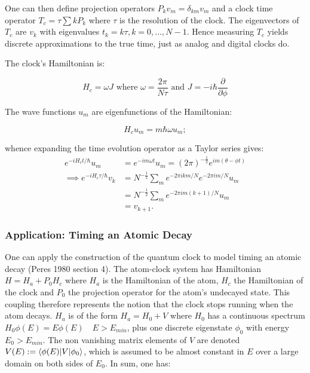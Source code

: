 \documentclass{article}
\begin{document}
\noindent One can then define projection operators $P_kv_m=\delta_{km}v_m$ and a clock time operator $T_c = \tau\sum{kP_k}$ where $\tau$ is the resolution of the clock. The eigenvectors of $T_c$ are $v_k$ with eigenvalues $t_k = k\tau, k=0,\dots,N-1$. Hence measuring $T_c$ yields discrete approximations to the true time, just as analog and digital clocks do. 

\noindent The clock's Hamiltonian is:

\begin{equation}
	H_c = \omega J \text{ where } \omega = \frac{2\pi}{N\tau} \text{ and } J=-i\hbar \frac{\partial}{\partial\phi}
	\label{clockhamiltonian}
\end{equation}

\noindent The wave functions $u_m$ are eigenfunctions of the Hamiltonian:

\begin{equation}
	H_cu_m = m\hbar\omega u_m;
	\label{clockwavefunctions}
\end{equation}

\noindent whence expanding the time evolution operator as a Taylor series gives:
\begin{subequations}
\begin{align}
	e^{-iH_ct/\hbar}u_m &= e^{-im\omega t}u_m = (2\pi)^{-\frac{1}{2}}e^{im(\theta-\phi t)} \\
	\implies e^{-iH_c\tau/\hbar}v_k &= N^{-\frac{1}{2}}\sum_{m}e^{-2\pi ikm/N}e^{-2\pi im/N}u_m \\
						       &= N^{-\frac{1}{2}}\sum_{m}e^{-2\pi im(k+1)/N}u_m \\
						       &= v_{k+1}.
\end{align}
\end{subequations}

\subsubsection{Application: Timing an Atomic Decay}
One can apply the construction of the quantum clock to model timing an atomic decay (Peres 1980 section 4). The atom-clock system has Hamiltonian $H=H_a+P_0H_c$ where $H_a$ is the Hamiltonian of the atom, $H_c$ the Hamiltonian of the clock and $P_0$ the projection operator for the atom's undecayed state. This coupling therefore represents the notion that the clock stops running when the atom decays. $H_a$ is of the form $H_a=H_0+V$ where $H_0$ has a continuous spectrum $H_0\phi(E) = E\phi(E) \quad E>E_{min}$, plus one discrete eigenstate $\phi_0$ with energy $E_0>E_{min}$. The non vanishing matrix elements of $V$ are denoted $V(E) := \braket{\phi(E)|V|\phi_0}$, which is assumed to be almost constant in $E$ over a large domain on both sides of $E_0$. In sum, one has:
\end{document}
